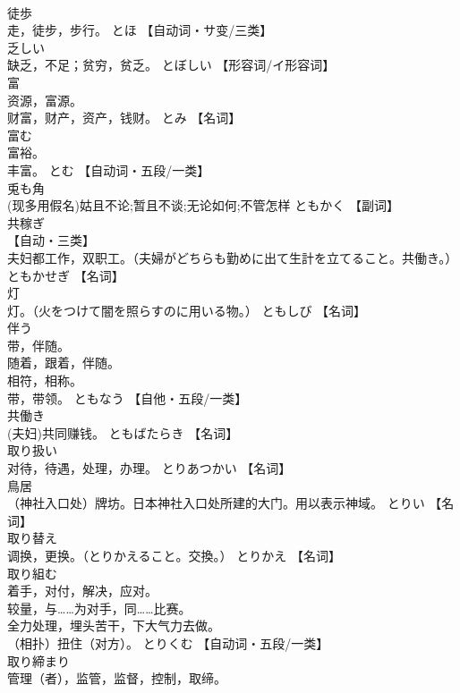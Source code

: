 \documentclass[8pt]{extreport}
\begin{document}
\begin{CJK}{UTF8}{min}
\\	徒歩	
\\	走，徒步，步行。	とほ		【自动词・サ变/三类】
\\	乏しい	
\\	缺乏，不足；贫穷，贫乏。	とぼしい		【形容词/イ形容词】
\\	富	
\\	资源，富源。 
\\	财富，财产，资产，钱财。	とみ		【名词】
\\	富む	
\\	富裕。 
\\	丰富。	とむ		【自动词・五段/一类】
\\	兎も角	
\\	(现多用假名)姑且不论;暂且不谈;无论如何;不管怎样	ともかく		【副词】
\\	共稼ぎ	
\\	【自动・三类】 
\\	夫妇都工作，双职工。（夫婦がどちらも勤めに出て生計を立てること。共働き。）	ともかせぎ		【名词】
\\	灯	
\\	灯。（火をつけて闇を照らすのに用いる物。）	ともしび		【名词】
\\	伴う	
\\	带，伴随。 
\\	随着，跟着，伴随。 
\\	相符，相称。 
\\	带，带领。	ともなう		【自他・五段/一类】
\\	共働き	
\\	(夫妇)共同赚钱。	ともばたらき		【名词】
\\	取り扱い	
\\	对待，待遇，处理，办理。	とりあつかい		【名词】
\\	鳥居	
\\	（神社入口处）牌坊。日本神社入口处所建的大门。用以表示神域。	とりい		【名词】
\\	取り替え	
\\	调换，更换。（とりかえること。交換。）	とりかえ		【名词】
\\	取り組む	
\\	着手，对付，解决，应对。 
\\	较量，与……为对手，同……比赛。 
\\	全力处理，埋头苦干，下大气力去做。 
\\	（相扑）扭住（对方）。	とりくむ		【自动词・五段/一类】
\\	取り締まり	
\\	管理（者），监管，监督，控制，取缔。 

\end{CJK}
\end{document}
